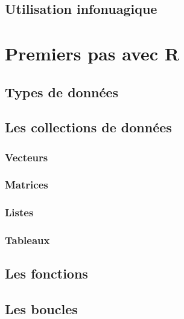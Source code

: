 \documentclass[]{book}
\begin{document}
\hypertarget{utilisation-infonuagique}{%
\subsection{Utilisation infonuagique}\label{utilisation-infonuagique}}

\hypertarget{premiers-pas-avec-r}{%
\section{Premiers pas avec R}\label{premiers-pas-avec-r}}

\hypertarget{types-de-donnuxe9es}{%
\subsection{Types de données}\label{types-de-donnuxe9es}}

\hypertarget{les-collections-de-donnuxe9es}{%
\subsection{Les collections de
données}\label{les-collections-de-donnuxe9es}}

\hypertarget{vecteurs}{%
\subsubsection{Vecteurs}\label{vecteurs}}

\hypertarget{matrices}{%
\subsubsection{Matrices}\label{matrices}}

\hypertarget{listes}{%
\subsubsection{Listes}\label{listes}}

\hypertarget{tableaux}{%
\subsubsection{Tableaux}\label{tableaux}}

\hypertarget{les-fonctions}{%
\subsection{Les fonctions}\label{les-fonctions}}

\hypertarget{les-boucles}{%
\subsection{Les boucles}\label{les-boucles}}
\end{document}
